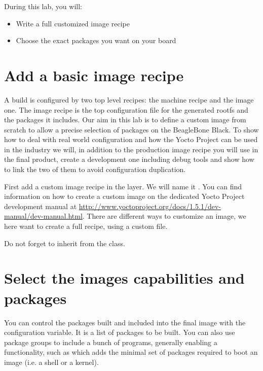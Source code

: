 
During this lab, you will:
\begin{itemize}
  \item Write a full customized image recipe
  \item Choose the exact packages you want on your board
\end{itemize}

\section{Add a basic image recipe}

A build is configured by two top level recipes: the machine recipe and the image
one. The image recipe is the top configuration file for the generated rootfs and
the packages it includes. Our aim in this lab is to define a custom image from
scratch to allow a precise selection of packages on the BeagleBone Black. To
show how to deal with real world configuration and how the Yocto Project can be
used in the industry we will, in addition to the production image recipe you
will use in the final product, create a development one including debug tools
and show how to link the two of them to avoid configuration duplication.

First add a custom image recipe in the  layer. We will name it
. You can find information on how to create a custom
image on the dedicated Yocto Project development manual at
\url{http://www.yoctoproject.org/docs/1.5.1/dev-manual/dev-manual.html}. There
are different ways to customize an image, we here want to create a full recipe,
using a custom  file.

Do not forget to inherit from the  class.

\section{Select the images capabilities and packages}

You can control the packages built and included into the final image with the
 configuration variable. It is a list of packages to be
built. You can also use package groups to include a bunch of programs, generally
enabling a functionality, such as  which adds the
minimal set of packages required to boot an image (i.e. a shell or a kernel).


